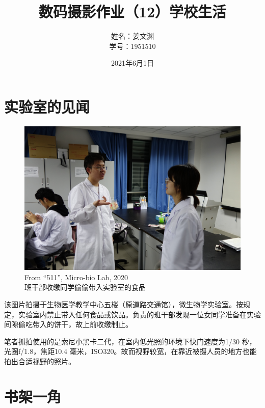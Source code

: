 \documentclass[cn,black,10pt,normal]{elegantnote}
\title{数码摄影作业（12）学校生活}
\author{姓名：姜文渊\\学号：1951510}
\date{2021年6月1日}
\begin{document}
 
\maketitle
 
\section{实验室的见闻}
 
\begin{figure}[H]
    \centering
    \includegraphics[width=1\textwidth]{image/DSC08163.JPG}
    \caption{From “511”, Micro-bio Lab, 2020\\班干部收缴同学偷偷带入实验室的食品}
    \label{F-01}
\end{figure}
 
该图片拍摄于生物医学教学中心五楼（原道路交通馆），微生物学实验室。按规定，实验室内禁止带入任何食品或饮品。负责的班干部发现一位女同学准备在实验间隙偷吃带入的饼干，故上前收缴制止。

笔者抓拍使用的是索尼小黑卡二代，在室内低光照的环境下快门速度为1/30 秒，光圈f/1.8，焦距10.4 毫米，ISO320。故而视野较宽，在靠近被摄人员的地方也能拍出合适视野的照片。
 
\section{书架一角}
 
\end{document}
